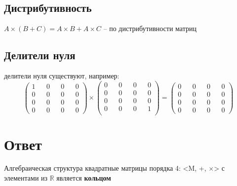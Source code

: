 \documentclass{article}
\begin{document}
\subsection*{Дистрибутивность}
$A\times(B+C) = A\times B+ A\times C$ -- по дистрибутивности матриц

\subsection*{Делители нуля}
делители нуля существуют, например:
$$
\begin{pmatrix}
    1 && 0 && 0 && 0 \\
    0 && 0 && 0 && 0 \\
    0 && 0 && 0 && 0 \\
    0 && 0 && 0 && 0
\end{pmatrix}
\times
\begin{pmatrix}
    0 && 0 && 0 && 0 \\
    0 && 0 && 0 && 0 \\
    0 && 0 && 0 && 0 \\
    0 && 0 && 0 && 1 \\
\end{pmatrix}
=
\begin{pmatrix}
    0 && 0 && 0 && 0 \\
    0 && 0 && 0 && 0 \\
    0 && 0 && 0 && 0 \\
    0 && 0 && 0 && 0
\end{pmatrix}
$$

\section*{Ответ}
Алгебраическая структура квадратные матрицы порядка 4: <M, +, $\times$>
с элементами из $\mathbb{R}$ является \textbf{кольцом}
\end{document}
